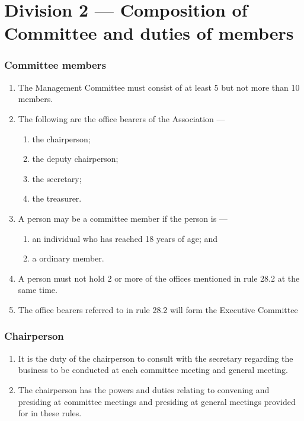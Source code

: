 \hypertarget{division-2-composition-of-committee-and-duties-of-members}{%
\part*{Division 2 --- Composition of Committee and duties of members}\label{division-2-composition-of-committee-and-duties-of-members}}

\hypertarget{committee-members}{%
\section{Committee members}\label{committee-members}}

\begin{enumerate}

\item The Management Committee must consist of at least 5 but not more than 10 members.
\item The following are the office bearers of the Association ---

  \begin{enumerate}
  
  \item the chairperson;
  \item the deputy chairperson;
  \item the secretary;
  \item the treasurer.
  \end{enumerate}
\item A person may be a committee member if the person is ---

  \begin{enumerate}
  
  \item an individual who has reached 18 years of age; and
  \item a ordinary member.
  \end{enumerate}
\item A person must not hold 2 or more of the offices mentioned in rule 28.2 at the same time.
\item The office bearers referred to in rule 28.2 will form the Executive Committee
\end{enumerate}

\hypertarget{chairperson}{%
\section{Chairperson}\label{chairperson}}

\begin{enumerate}

\item It is the duty of the chairperson to consult with the secretary regarding the business to be conducted at each committee meeting and general meeting.
\item The chairperson has the powers and duties relating to convening and presiding at committee meetings and presiding at general meetings provided for in these rules.
\end{enumerate}


